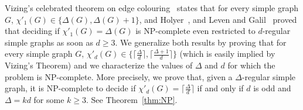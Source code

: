 \documentclass[11pt]{article}
\newtheorem{theorem}[lemma]{Theorem}
\begin{document}

\medskip

Vizing's celebrated theorem on edge colouring~\cite{V64} states that for every simple graph $G$, $\chi'_1(G) \in \{\Delta(G), \Delta(G) +1\}$, and Holyer~\cite{H81}, and Leven and Galil~\cite{LZ83} proved that deciding if $\chi'_1(G) =\Delta(G)$ is NP-complete even restricted to $d$-regular simple graphs as soon as $d \geq 3$. 
We generalize both results by proving that for every simple graph $G$, $\chi'_{d}(G) \in \{ \lceil \frac{\Delta}{d} \rceil, \lceil \frac{\Delta+1}{d} \rceil \}$ (which is easily implied by Vizing's Theorem) and we characterize the values of $\Delta$ and $d$ for which the problem is NP-complete. More precisely, we prove that, given a $\Delta$-regular simple graph, it is NP-complete to decide if $\chi'_d(G) = \lceil \frac{\Delta}{d} \rceil$ if and only if $d$ is odd and $\Delta = kd$ for some $k \geq 3$. See Theorem~\ref{thm:NP}. 
\medskip
\end{document}
